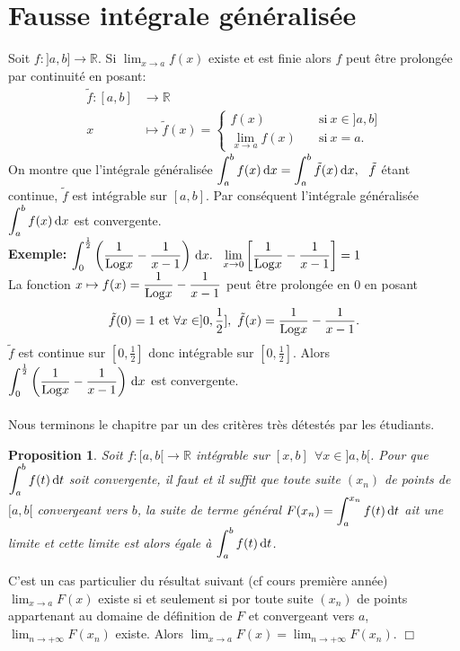 \documentclass[11pt, a4paper]{book}
\newtheorem{pro}{Proposition}[section]
\newenvironment{pr}{\noindent {\bf Preuve} \noindent} {\hfill $\Box$\vskip 5mm}
\begin{document}
\section{Fausse int\'egrale g\'en\'eralis\'ee}
Soit $f:]a,b]\longrightarrow \mathbb{R}$. Si ${\displaystyle \lim_{x\rightarrow a}f(x)}$ existe et est finie alors $f$ peut \^etre prolong\'ee par continuit\'e en posant: \begin{align*}  \tilde{f} : [a,b]&\longrightarrow \mathbb{R} \\ x&\longmapsto \tilde{f}(x)= \begin{cases} f(x) &\quad\text{si}~x\in ]a,b]\\{\displaystyle \lim_{x\rightarrow a}f(x)} &\quad\text{si}~x=a.\end{cases} \end{align*}
On montre que l'int\'egrale g\'en\'eralis\'ee ${\displaystyle \int_a^bf(x)\,\mathrm{d} x=\int_a^b \tilde{f}(x)\,\mathrm{d} x,~~\tilde{f}}$ \'etant continue, $\tilde{f}$ est int\'egrable sur $[a,b]$. Par cons\'equent l'int\'egrale g\'en\'eralis\'ee ${\displaystyle \int_a^bf(x)\,\mathrm{d} x }$ est convergente.\\
\textbf{Exemple:}  ${\displaystyle \int_{0}^{\frac{1}{2}}\left( \dfrac{1}{\mathrm{Log} x}-\dfrac{1}{x-1}\right) \,\mathrm{d} x.~~\lim_{x\rightarrow 0}\left[ \dfrac{1}{\mathrm{Log} x}-\dfrac{1}{x-1}\right] =1}$\\ 
La fonction $x\mapsto f(x)=\dfrac{1}{\mathrm{Log} x}-\dfrac{1}{x-1}$ peut \^etre prolong\'ee en $0$ en posant $$ \tilde{f}(0)=1 \text{ et}~  \forall x \in ]0,\frac{1}{2}],~ \tilde{f}(x)=\dfrac{1}{\mathrm{Log} x}-\dfrac{1}{x-1}.$$  $\tilde{f} $  est continue sur $[0,\frac{1}{2}]$ donc int\'egrable sur $[0,\frac{1}{2}]$. Alors ${\displaystyle  \int_0^{\frac{1}{2}}\left( \dfrac{1}{\mathrm{Log} x}-\dfrac{1}{x-1}\right) \,\mathrm{d} x}$ est convergente.\\ \\
Nous terminons le chapitre par un des crit\`eres tr\`es d\'etest\'es par les \'etudiants.
\begin{pro} \label{pro3.4.1}
Soit $f:[a,b[\longrightarrow \mathbb{R}$ int\'egrable sur $[x,b] ~~\forall x\in ]a,b[$. Pour que ${\displaystyle \int_a^b f(t)\,\mathrm{d} t}$ soit convergente, il faut et il suffit que toute suite $(x_n)$ de points de $[a,b[$ convergeant vers $b$, la suite de terme g\'en\'eral ${\displaystyle F(x_n)=\int_a^{x_n} f(t)\,\mathrm{d} t}$ ait une limite et cette limite est alors \'egale \`a ${\displaystyle \int_a^b f(t)\,\mathrm{d} t}$.
\end{pro}
\begin{pr}\quad
C'est un cas particulier du r\'esultat suivant (cf cours premi\`ere ann\'ee)\\
${\displaystyle \lim_{x\rightarrow a}F(x)}$ existe si et seulement si por toute suite $(x_n)$ de points appartenant au domaine de d\'efinition de $F$ et convergeant vers $a$, ${\displaystyle \lim_{n\rightarrow +\infty} F(x_n)}$ existe. Alors ${\displaystyle \lim_{x\rightarrow a} F(x)=\lim_{n\rightarrow+\infty} F(x_n).}$
\end{pr}
\end{document}
